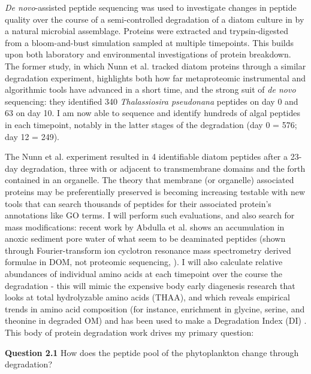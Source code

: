 \documentclass[12pt, letterpaper, twoside]{article}
\begin{document}
\textit{De novo}-assisted peptide sequencing was used to investigate changes in peptide quality over the course of a semi-controlled degradation of a diatom culture in by a natural microbial assemblage. Proteins were extracted and trypsin-digested from a bloom-and-bust simulation sampled at multiple timepoints. This builds upon both laboratory \cite{nunn_path_2010} and environmental investigations \cite{moore_identifying_2012} of protein breakdown. The former study, in which Nunn et al. tracked diatom proteins through a similar degradation experiment, highlights both how far metaproteomic instrumental and algorithmic tools have advanced in a short time, and the strong suit of \textit{de novo} sequencing: they identified 340 \textit{Thalassiosira pseudonana} peptides on day 0 and 63 on day 10. I am now able to sequence and identify hundreds of algal peptides in each timepoint, notably in the latter stages of the degradation (day 0 = 576; day 12 = 249). 

The Nunn et al. experiment resulted in 4 identifiable diatom peptides after a 23-day degradation, three with or adjacent to transmembrane domains and the forth contained in an organelle. The theory that membrane (or organelle) associated proteins may be preferentially preserved \cite{wolfe_first_2006} is becoming increasing testable with new tools that can search thousands of peptides for their associated protein's annotations like GO terms. I will perform such evaluations, and also search for mass modifications: recent work by Abdulla et al. shows an accumulation in anoxic sediment pore water of what seem to be deaminated peptides (shown through Fourier-transform ion cyclotron resonance mass spectrometry derived formulae in DOM, not proteomic sequencing, \cite{abdulla_accumulation_2018}). I will also calculate relative abundances of individual amino acids at each timepoint over the course the degradation - this will mimic the expensive body early diagenesis research that looks at total hydrolyzable amino acids (THAA), and which reveals empirical trends in amino acid composition (for instance, enrichment in glycine, serine, and theonine in degraded OM) and has been used to make a Degradation Index (DI) \cite{dauwe_amino_1998}. This body of protein degradation work drives my primary question:

\bigskip

\textbf{Question 2.1} How does the peptide pool of the phytoplankton change through degradation?

\bigskip
\end{document}
